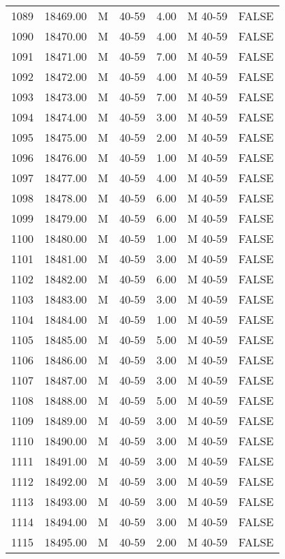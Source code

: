 \begin{table}[ht]
\begin{tabular}{rrllrll}
  1089 & 18469.00 & M & 40-59 & 4.00 & M 40-59 & FALSE \\ 
  1090 & 18470.00 & M & 40-59 & 4.00 & M 40-59 & FALSE \\ 
  1091 & 18471.00 & M & 40-59 & 7.00 & M 40-59 & FALSE \\ 
  1092 & 18472.00 & M & 40-59 & 4.00 & M 40-59 & FALSE \\ 
  1093 & 18473.00 & M & 40-59 & 7.00 & M 40-59 & FALSE \\ 
  1094 & 18474.00 & M & 40-59 & 3.00 & M 40-59 & FALSE \\ 
  1095 & 18475.00 & M & 40-59 & 2.00 & M 40-59 & FALSE \\ 
  1096 & 18476.00 & M & 40-59 & 1.00 & M 40-59 & FALSE \\ 
  1097 & 18477.00 & M & 40-59 & 4.00 & M 40-59 & FALSE \\ 
  1098 & 18478.00 & M & 40-59 & 6.00 & M 40-59 & FALSE \\ 
  1099 & 18479.00 & M & 40-59 & 6.00 & M 40-59 & FALSE \\ 
  1100 & 18480.00 & M & 40-59 & 1.00 & M 40-59 & FALSE \\ 
  1101 & 18481.00 & M & 40-59 & 3.00 & M 40-59 & FALSE \\ 
  1102 & 18482.00 & M & 40-59 & 6.00 & M 40-59 & FALSE \\ 
  1103 & 18483.00 & M & 40-59 & 3.00 & M 40-59 & FALSE \\ 
  1104 & 18484.00 & M & 40-59 & 1.00 & M 40-59 & FALSE \\ 
  1105 & 18485.00 & M & 40-59 & 5.00 & M 40-59 & FALSE \\ 
  1106 & 18486.00 & M & 40-59 & 3.00 & M 40-59 & FALSE \\ 
  1107 & 18487.00 & M & 40-59 & 3.00 & M 40-59 & FALSE \\ 
  1108 & 18488.00 & M & 40-59 & 5.00 & M 40-59 & FALSE \\ 
  1109 & 18489.00 & M & 40-59 & 3.00 & M 40-59 & FALSE \\ 
  1110 & 18490.00 & M & 40-59 & 3.00 & M 40-59 & FALSE \\ 
  1111 & 18491.00 & M & 40-59 & 3.00 & M 40-59 & FALSE \\ 
  1112 & 18492.00 & M & 40-59 & 3.00 & M 40-59 & FALSE \\ 
  1113 & 18493.00 & M & 40-59 & 3.00 & M 40-59 & FALSE \\ 
  1114 & 18494.00 & M & 40-59 & 3.00 & M 40-59 & FALSE \\ 
  1115 & 18495.00 & M & 40-59 & 2.00 & M 40-59 & FALSE \\ 

\end{tabular}
\end{table}
